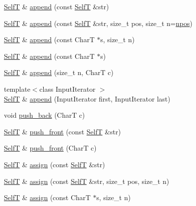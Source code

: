 \begin{CompactItemize}
\item 
\hyperlink{classdeque__string}{SelfT} \& \hyperlink{classdeque__string_5e906ef1d178767fdf3c0058f5eeed55}{append} (const \hyperlink{classdeque__string}{SelfT} \&str)
\item 
\hyperlink{classdeque__string}{SelfT} \& \hyperlink{classdeque__string_126a9388b25ceecb1c4ad3bc4ac4b087}{append} (const \hyperlink{classdeque__string}{SelfT} \&str, size\_\-t pos, size\_\-t n=\hyperlink{classdeque__string_b2a5692bbdd473486ce93df0cadd2540}{npos})
\item 
\hyperlink{classdeque__string}{SelfT} \& \hyperlink{classdeque__string_b3efd86d189fba40ab8587cbfb9b22a0}{append} (const CharT $\ast$s, size\_\-t n)
\item 
\hyperlink{classdeque__string}{SelfT} \& \hyperlink{classdeque__string_bc602a34e52a44a96690152a296ffb71}{append} (const CharT $\ast$s)
\item 
\hyperlink{classdeque__string}{SelfT} \& \hyperlink{classdeque__string_1b25953cd90a749e1381220ba20bb42e}{append} (size\_\-t n, CharT c)
\item 
{\footnotesize template$<$class InputIterator $>$ }\\\hyperlink{classdeque__string}{SelfT} \& \hyperlink{classdeque__string_315b9c547074d7ce32814aa011e26b39}{append} (InputIterator first, InputIterator last)
\item 
void \hyperlink{classdeque__string_c6bb97ddcf4da6d778782a90dabb1866}{push\_\-back} (CharT c)
\item 
\hyperlink{classdeque__string}{SelfT} \& \hyperlink{classdeque__string_466e757d7ca5a6f9680f00b56eb3cd22}{push\_\-front} (const \hyperlink{classdeque__string}{SelfT} \&str)
\item 
\hyperlink{classdeque__string}{SelfT} \& \hyperlink{classdeque__string_0c68ec4134f82d210d03599c5ec161e8}{push\_\-front} (CharT c)
\item 
\hyperlink{classdeque__string}{SelfT} \& \hyperlink{classdeque__string_93be2245162d2b65148b106e457e24ae}{assign} (const \hyperlink{classdeque__string}{SelfT} \&str)
\item 
\hyperlink{classdeque__string}{SelfT} \& \hyperlink{classdeque__string_d40c73d6f33a68ca241440ec530096a8}{assign} (const \hyperlink{classdeque__string}{SelfT} \&str, size\_\-t pos, size\_\-t n)
\item 
\hyperlink{classdeque__string}{SelfT} \& \hyperlink{classdeque__string_df1494cee904a87cd5dd927b9bb2a3bf}{assign} (const CharT $\ast$s, size\_\-t n)
\item 

\end{CompactItemize}
